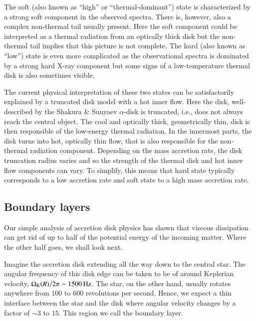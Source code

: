 The soft (also known as ``high'' or ``thermal-dominant'') state is characterized by a strong soft component in the observed spectra.\cite{GZP99}
There is, however, also a complex non-thermal tail usually present.\cite{MRC00}
Here the soft component could be interpreted as a thermal radiation from an optically thick disk but the non-thermal tail implies that this picture is not complete.
The hard (also known as ``low'') state is even more complicated as the observational spectra is dominated by a strong hard X-ray component but some signs of a low-temperature thermal disk is also sometimes visible.\cite[see, e.g.,][]{ZG04}

The current physical interpretation of these two states can be satisfactorily explained by a truncated disk model with a hot inner flow.
Here the disk, well-described by the Shakura \& Sunyaev $\alpha$-disk is truncated, i.e., does not always reach the central object.
The cool and optically thick, geometrically thin, disk is then responsible of the low-energy thermal radiation.
In the innermost parts, the disk turns into hot, optically thin flow, that is also responsible for the non-thermal radiation component.
Depending on the mass accretion rate, the disk truncation radius varies and so the strength of the thermal disk and hot inner flow components can vary.
To simplify, this means that hard state typically corresponds to a low accretion rate and soft state to a high mass accretion rate.


\subsection{Boundary layers}

Our simple analysis of accretion disk physics has shown that viscous dissipation can get rid of up to half of the potential energy of the incoming matter.
Where the other half goes, we shall look next.

Imagine the accretion disk extending all the way down to the central star.
The angular frequency of this disk edge can be taken to be of around Keplerian velocity, $\Omega_{\mathrm{K}}(R)/2\pi \sim 1500 \,\mathrm{Hz}$.
The star, on the other hand, usually rotates anywhere from $100$ to $600$ revolutions per second.\cite{Watts12, PTR14}
Hence, we expect a thin interface between the star and the disk where angular velocity changes by a factor of $\sim 3$ to $15$.
This region we call the boundary layer.

